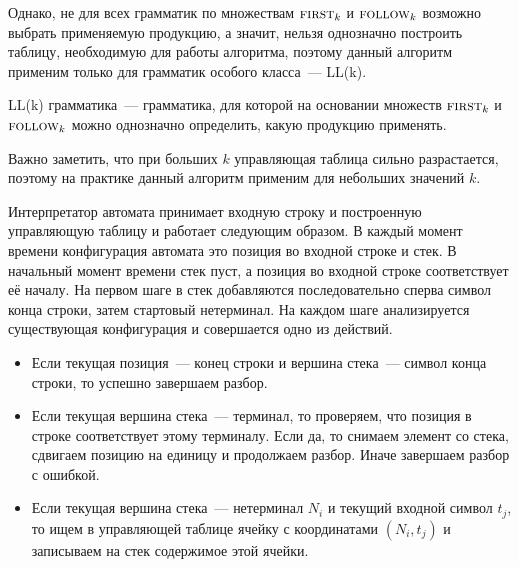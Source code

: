 Однако, не для всех грамматик по множествам $\first[k]$ и $\follow[k]$ возможно выбрать применяемую продукцию, а значит, нельзя однозначно построить таблицу, необходимую для работы алгоритма, поэтому данный алгоритм применим только для грамматик особого класса~--- LL(k).

\begin{definition}
  LL(k) грамматика~--- грамматика, для которой на основании множеств $\first[k]$ и $\follow[k]$ можно однозначно определить, какую продукцию применять.
\end{definition}

Важно заметить, что при больших $k$ управляющая таблица сильно разрастается, поэтому на практике данный алгоритм применим для небольших значений $k$.

Интерпретатор автомата принимает входную строку и построенную управляющую таблицу и работает следующим образом.
В каждый момент времени конфигурация автомата это позиция во входной строке и стек.
В начальный момент времени стек пуст, а позиция во входной строке соответствует её началу.
На первом шаге в стек добавляются последовательно сперва символ конца строки, затем стартовый нетерминал.
На каждом шаге анализируется существующая конфигурация и совершается одно из действий.
\begin{itemize}
\item Если текущая позиция~--- конец строки и вершина стека~--- символ конца строки, то успешно завершаем разбор.
\item Если текущая вершина стека~--- терминал, то проверяем, что позиция в строке соответствует этому терминалу. Если да, то снимаем элемент со стека, сдвигаем позицию на единицу и продолжаем разбор. Иначе завершаем разбор с ошибкой.
\item Если текущая вершина стека~--- нетерминал $N_i$ и текущий входной символ $t_j$, то ищем в управляющей таблице ячейку с координатами $(N_i, t_j)$ и записываем на стек содержимое этой ячейки.
\end{itemize}

